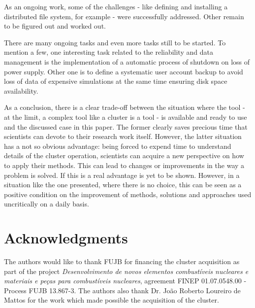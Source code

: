 \documentclass[twoside,a4paper,12pt,english]{inac17}
\begin{document}
As an ongoing work, some of the challenges - like defining and installing a distributed file system, for example - were successfully
addressed. Other remain to be figured out and worked out.

There are many ongoing tasks and even more tasks still to be started. To mention a few, one
interesting task related to the reliability and data management is the implementation of
a automatic process of shutdown on loss of power supply. Other one is to define a systematic
user account backup to avoid loss of data of expensive simulations at the same time ensuring
disk space availability.

As a conclusion, there is a clear trade-off between the situation where the tool - at the limit, a complex tool like a cluster is a tool - is available and ready to use and
the discussed case in this paper. The former clearly saves precious time that scientists can devote to their research work itself. However, the latter situation has a not so obvious
advantage: being forced to expend time to understand details of the cluster operation, scientists can acquire a new perspective on how to apply their
methods. This can lead to changes or improvements in the way a problem is solved. If this is a real advantage is yet to be shown. However,
in a situation like the one presented, where there is no choice, this can be seen as a positive condition on the improvement of methods, solutions and approaches used
uncritically on a daily basis.







\section*{Acknowledgments}
The authors would like to thank FUJB for financing the cluster acquisition
as part of the project \textit{Desenvolvimento de novos elementos combust\'{i}veis nucleares
  e materiais e pe\c{c}as para combust\'{i}veis nucleares}, agreement FINEP 01.07.0548.00 - Process FUJB 13.867-3.
The authors also thank Dr. Jo\~{a}o Roberto Loureiro de Mattos for the work which made possible the acquisition
of the cluster.

\end{document}
